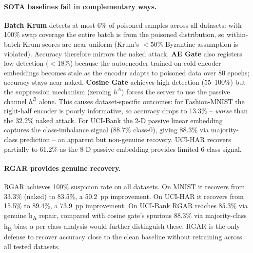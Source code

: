 \documentclass{article}
\begin{document}
\paragraph{SOTA baselines fail in complementary ways.}
\textbf{Batch Krum} detects at most 6\% of poisoned samples across all
datasets: with 100\% swap coverage the entire batch is from the poisoned
distribution, so within-batch Krum scores are near-uniform (Krum's $<$50\%
Byzantine assumption is violated).
Accuracy therefore mirrors the naked attack.
\textbf{AE Gate} also registers low detection ($<$18\%) because the
autoencoder trained on cold-encoder embeddings becomes stale as the encoder
adapts to poisoned data over 80 epochs; accuracy stays near naked.
\textbf{Cosine Gate} achieves high detection (55--100\%) but the suppression
mechanism (zeroing $h^A$) forces the server to use the passive channel
$h^B$ alone.
This causes dataset-specific outcomes: for Fashion-MNIST the right-half
encoder is poorly informative, so accuracy drops to 13.3\% -- \emph{worse}
than the 32.2\% naked attack.
For UCI-Bank the 2-D passive linear embedding captures the class-imbalance
signal (88.7\% class-0), giving 88.3\% via majority-class prediction --
an apparent but non-genuine recovery.
UCI-HAR recovers partially to 61.2\% as the 8-D passive embedding provides
limited 6-class signal.

\paragraph{RGAR provides genuine recovery.}
RGAR achieves 100\% suspicion rate on all datasets.
On MNIST it recovers from 33.3\% (naked) to 83.5\%, a 50.2~pp improvement.
On UCI-HAR it recovers from 15.5\% to 89.4\%, a 73.9~pp improvement.
On UCI-Bank RGAR reaches 85.3\% via genuine h\textsubscript{A} repair,
compared with cosine gate's spurious 88.3\% via majority-class h\textsubscript{B}
bias; a per-class analysis would further distinguish these.
RGAR is the only defense to recover accuracy close to the clean baseline
without retraining across all tested datasets.
\end{document}
